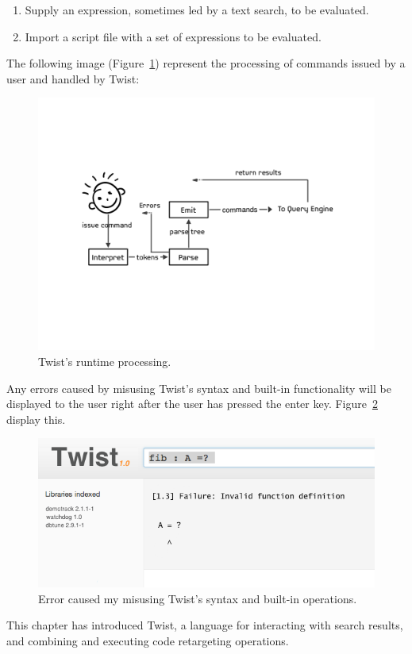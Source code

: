 \begin{enumerate}
	\item Supply an expression, sometimes led by a text search, to be evaluated.
	\item Import a script file with a set of expressions to be evaluated. 
\end{enumerate}	

The following image (Figure~\ref{fig:runtime}) represent the processing of commands issued by a user and handled by Twist:

\begin{figure}[!ht]
    \centering
    \includegraphics[width=\textwidth]{images/runtime}
    \caption{Twist's runtime processing.}
    \label{fig:runtime}
\end{figure} 

Any errors caused by misusing Twist's syntax and built-in functionality will be displayed to the user right after the user has pressed the enter key. Figure~\ref{fig:error} display this.

\begin{figure}[!ht]
    \centering
    \includegraphics[width=\textwidth]{images/error}
    \caption{Error caused my misusing Twist's syntax and built-in operations.}
    \label{fig:error}
\end{figure} 
 
 This chapter has introduced Twist, a language for interacting with search results, and combining and executing code retargeting operations. 
